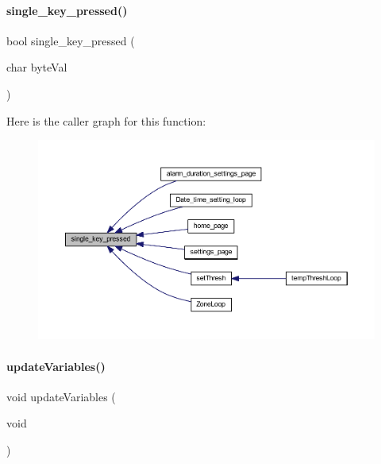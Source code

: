 \paragraph{single\+\_\+key\+\_\+pressed()}
{\footnotesize\ttfamily bool single\+\_\+key\+\_\+pressed (\begin{DoxyParamCaption}\item[{char}]{byte\+Val }\end{DoxyParamCaption})}

Here is the caller graph for this function\+:
\nopagebreak
\begin{figure}[H]
\begin{center}
\leavevmode
\includegraphics[width=350pt]{a00023_a8ac785f2d4c8d133c61c4e9be06cb606_icgraph}
\end{center}
\end{figure}
\mbox{\label{a00023_a77a749cc64c8c52f24cfa7d5a886435e}} 
\paragraph{update\+Variables()}
{\footnotesize\ttfamily void update\+Variables (\begin{DoxyParamCaption}\item[{void}]{ }\end{DoxyParamCaption})}

